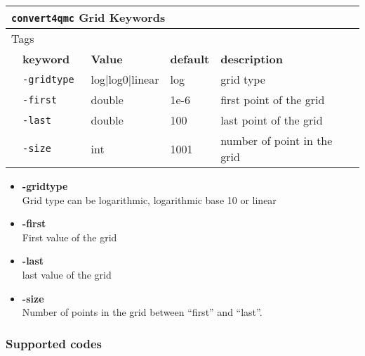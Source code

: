 \begin{table}[h]
 \begin{center}
 \begin{tabularx}{\textwidth}{l l l l l }
 \hline
 \multicolumn{5}{l}{\texttt{convert4qmc} Grid Keywords} \\
 \hline
 \multicolumn{2}{l}{Tags}  & \multicolumn{3}{l}{}\\
    &   \bfseries keyword      & \bfseries Value & \bfseries default   & \bfseries description \\
    &   \texttt{-gridtype    } &  log|log0|linear      &  log & grid type  \\
    &   \texttt{-first         } & double  &  1e-6 & first point of the grid   \\
    &   \texttt{-last       } & double  & 100 & last point of the grid \\
    &   \texttt{-size      } &  int    &  1001& number of point in the grid   \\
     \hline
     \end{tabularx}
 \end{center}
 \end{table}
\begin{itemize}
\item \textbf{-gridtype}\\
Grid type can be logarithmic, logarithmic base 10 or linear \\
\item \textbf{-first}\\
First value of the grid\\
\item \textbf{-last}\\
last value of the grid\\
\item \textbf{-size}\\
Number of points in the grid between ``first'' and ``last''. \\
\end{itemize}


\subsubsection{Supported codes}


